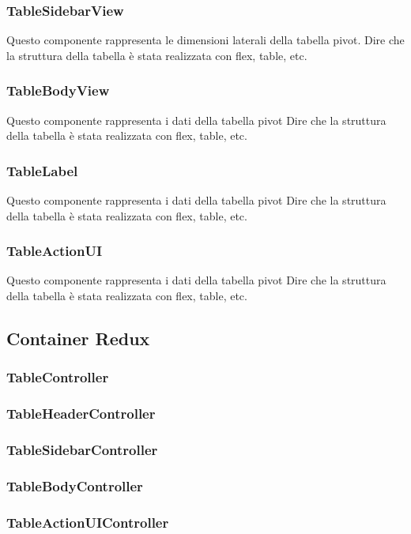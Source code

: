 \subsubsection{TableSidebarView}
Questo componente rappresenta le dimensioni laterali della tabella pivot.
Dire che la struttura della tabella è stata realizzata con flex, table, etc.

\subsubsection{TableBodyView}
Questo componente rappresenta i dati della tabella pivot
Dire che la struttura della tabella è stata realizzata con flex, table, etc.

\subsubsection{TableLabel}
Questo componente rappresenta i dati della tabella pivot
Dire che la struttura della tabella è stata realizzata con flex, table, etc.

\subsubsection{TableActionUI}
Questo componente rappresenta i dati della tabella pivot
Dire che la struttura della tabella è stata realizzata con flex, table, etc.

\subsection{Container Redux}
\subsubsection{TableController}
\subsubsection{TableHeaderController}
\subsubsection{TableSidebarController}
\subsubsection{TableBodyController}
\subsubsection{TableActionUIController}
